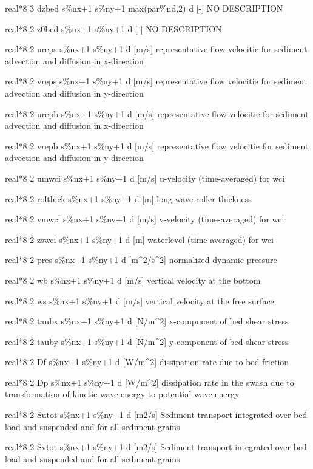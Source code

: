 real*8  3  dzbed    s\%nx+1 s\%ny+1 max(par\%nd,2) d [-] NO DESCRIPTION

real*8  2  z0bed    s\%nx+1 s\%ny+1 d  [-] NO DESCRIPTION

real*8  2  ureps     s\%nx+1 s\%ny+1 d [m/s] representative flow velocitie for sediment advection and diffusion in x-direction

real*8  2  vreps     s\%nx+1 s\%ny+1 d  [m/s] representative flow velocitie for sediment advection and diffusion in y-direction

real*8  2  urepb     s\%nx+1 s\%ny+1 d [m/s] representative flow velocitie for sediment advection and diffusion in x-direction

real*8  2  vrepb     s\%nx+1 s\%ny+1 d [m/s] representative flow velocitie for sediment advection and diffusion in y-direction

real*8  2  umwci     s\%nx+1 s\%ny+1 d  [m/s]    u-velocity (time-averaged) for wci

real*8  2  rolthick s\%nx+1 s\%ny+1 d  [m]  long wave roller thickness

real*8  2  vmwci     s\%nx+1 s\%ny+1 d  [m/s]    v-velocity (time-averaged) for wci

real*8  2  zswci     s\%nx+1 s\%ny+1 d  [m]    waterlevel (time-averaged) for wci

real*8  2  pres      s\%nx+1 s\%ny+1 d  [m\^{}2/s\^{}2] normalized dynamic pressure

real*8  2  wb        s\%nx+1 s\%ny+1 d  [m/s]     vertical velocity at the bottom

real*8  2  ws        s\%nx+1 s\%ny+1 d  [m/s]     vertical velocity at the free surface

real*8  2  taubx     s\%nx+1 s\%ny+1 d  [N/m\^{}2]   x-component of bed shear stress

real*8  2  tauby     s\%nx+1 s\%ny+1 d  [N/m\^{}2]   y-component of bed shear stress

real*8  2  Df        s\%nx+1 s\%ny+1 d  [W/m\^{}2]   dissipation rate due to bed friction

real*8  2  Dp        s\%nx+1 s\%ny+1 d  [W/m\^{}2]   dissipation rate in the swash due to transformation of kinetic wave energy to potential wave energy

real*8  2  Sutot     s\%nx+1 s\%ny+1 d  [m2/s]   Sediment transport integrated over bed load and suspended and for all sediment grains

real*8  2  Svtot     s\%nx+1 s\%ny+1 d  [m2/s]   Sediment transport integrated over bed load and suspended and for all sediment grains

